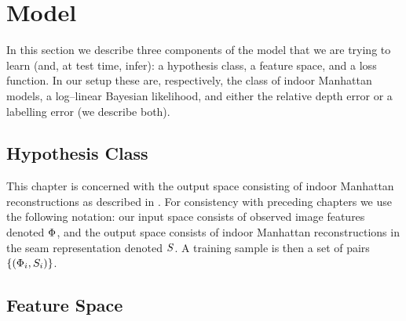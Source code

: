 \section{Model}
\label{sec:model}

In this section we describe three components of the model that we are
trying to learn (and, at test time, infer): a hypothesis class, a
feature space, and a loss function. In our setup these are,
respectively, the class of indoor Manhattan models, a log--linear
Bayesian likelihood, and either the relative depth error or a
labelling error (we describe both).

\subsection{Hypothesis Class}

This chapter is concerned with the output space consisting of indoor
Manhattan reconstructions as described in . For
consistency with preceding chapters we use the following notation:
our input space consists of observed image features denoted
$\Features$, and the output space consists of indoor Manhattan
reconstructions in the seam representation denoted $\Seam$. A training
sample is then a set of pairs $\{(\Features_i,\Seam_i)\}$.

\subsection{Feature Space}

